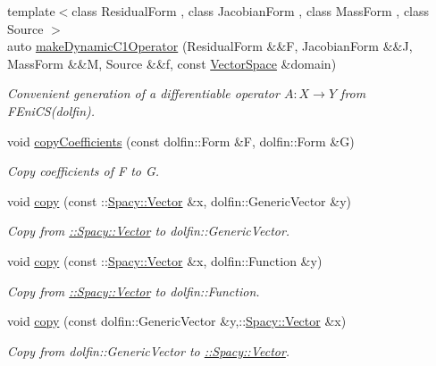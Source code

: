 \begin{DoxyCompactItemize}
{\footnotesize template$<$class Residual\+Form , class Jacobian\+Form , class Mass\+Form , class Source $>$ }\\auto \hyperlink{group__FenicsGroup_ga467a0e85b66c8f17cdaf2884d5d443cd_ga467a0e85b66c8f17cdaf2884d5d443cd}{make\+Dynamic\+C1\+Operator} (Residual\+Form \&\&F, Jacobian\+Form \&\&J, Mass\+Form \&\&M, Source \&\&f, const \hyperlink{classSpacy_1_1VectorSpace}{Vector\+Space} \&domain)
\begin{DoxyCompactList}\small\item\em Convenient generation of a differentiable operator $A: X\rightarrow Y$ from F\+Eni\+C\+S(dolfin). \end{DoxyCompactList}\item 
void \hyperlink{group__FenicsGroup_gab3d4c7c1e91a50e4e816598258b6edce_gab3d4c7c1e91a50e4e816598258b6edce}{copy\+Coefficients} (const dolfin\+::\+Form \&F, dolfin\+::\+Form \&G)
\begin{DoxyCompactList}\small\item\em Copy coefficients of F to G. \end{DoxyCompactList}\item 
void \hyperlink{group__FenicsGroup_ga7f43f0c660d0646adb031b453c536bb0_ga7f43f0c660d0646adb031b453c536bb0}{copy} (const \+::\hyperlink{classSpacy_1_1Vector}{Spacy\+::\+Vector} \&x, dolfin\+::\+Generic\+Vector \&y)
\begin{DoxyCompactList}\small\item\em Copy from \hyperlink{group__SpacyGroup_gafc144d2730ef87a67e54f8cd750b1f54_VectorAnchor}{\+:\+:Spacy\+:\+:Vector} to dolfin\+::\+Generic\+Vector. \end{DoxyCompactList}\item 
void \hyperlink{group__FenicsGroup_ga28fb1ebae29e07ec0256bb2331599aa7_ga28fb1ebae29e07ec0256bb2331599aa7}{copy} (const \+::\hyperlink{classSpacy_1_1Vector}{Spacy\+::\+Vector} \&x, dolfin\+::\+Function \&y)
\begin{DoxyCompactList}\small\item\em Copy from \hyperlink{group__SpacyGroup_gafc144d2730ef87a67e54f8cd750b1f54_VectorAnchor}{\+:\+:Spacy\+:\+:Vector} to dolfin\+::\+Function. \end{DoxyCompactList}\item 
void \hyperlink{group__FenicsGroup_ga61c5e45dbb789c155fbf86f8ec288f17_ga61c5e45dbb789c155fbf86f8ec288f17}{copy} (const dolfin\+::\+Generic\+Vector \&y,\+::\hyperlink{classSpacy_1_1Vector}{Spacy\+::\+Vector} \&x)
\begin{DoxyCompactList}\small\item\em Copy from dolfin\+::\+Generic\+Vector to \hyperlink{group__SpacyGroup_gafc144d2730ef87a67e54f8cd750b1f54_VectorAnchor}{\+:\+:Spacy\+:\+:Vector}. \end{DoxyCompactList}\item 

\end{DoxyCompactItemize}
